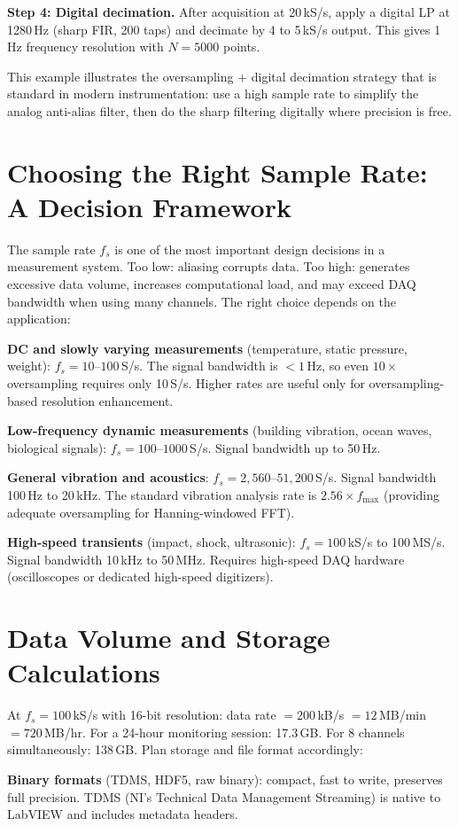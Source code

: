 \documentclass[11pt,letterpaper,twoside,openany]{book}
\begin{document}
\textbf{Step 4: Digital decimation.} After acquisition at 20\,kS/s, apply a digital LP at 1280\,Hz (sharp FIR, 200 taps) and decimate by 4 to 5\,kS/s output. This gives 1\,Hz frequency resolution with $N = 5000$ points.

This example illustrates the oversampling + digital decimation strategy that is standard in modern instrumentation: use a high sample rate to simplify the analog anti-alias filter, then do the sharp filtering digitally where precision is free.
\section{Choosing the Right Sample Rate: A Decision Framework}
The sample rate $f_s$ is one of the most important design decisions in a measurement system. Too low: aliasing corrupts data. Too high: generates excessive data volume, increases computational load, and may exceed DAQ bandwidth when using many channels. The right choice depends on the application:

\textbf{DC and slowly varying measurements} (temperature, static pressure, weight): $f_s = 10$--$100$\,S/s. The signal bandwidth is $< 1$\,Hz, so even $10\times$ oversampling requires only 10\,S/s. Higher rates are useful only for oversampling-based resolution enhancement.

\textbf{Low-frequency dynamic measurements} (building vibration, ocean waves, biological signals): $f_s = 100$--$1000$\,S/s. Signal bandwidth up to 50\,Hz.

\textbf{General vibration and acoustics}: $f_s = 2{,}560$--$51{,}200$\,S/s. Signal bandwidth 100\,Hz to 20\,kHz. The standard vibration analysis rate is $2.56 \times f_{\max}$ (providing adequate oversampling for Hanning-windowed FFT).

\textbf{High-speed transients} (impact, shock, ultrasonic): $f_s = 100$\,kS/s to 100\,MS/s. Signal bandwidth 10\,kHz to 50\,MHz. Requires high-speed DAQ hardware (oscilloscopes or dedicated high-speed digitizers).

\section{Data Volume and Storage Calculations}
At $f_s = 100$\,kS/s with 16-bit resolution: data rate $= 200$\,kB/s $= 12$\,MB/min $= 720$\,MB/hr. For a 24-hour monitoring session: 17.3\,GB. For 8 channels simultaneously: 138\,GB. Plan storage and file format accordingly:

\textbf{Binary formats} (TDMS, HDF5, raw binary): compact, fast to write, preserves full precision. TDMS (NI's Technical Data Management Streaming) is native to LabVIEW and includes metadata headers.
\end{document}
